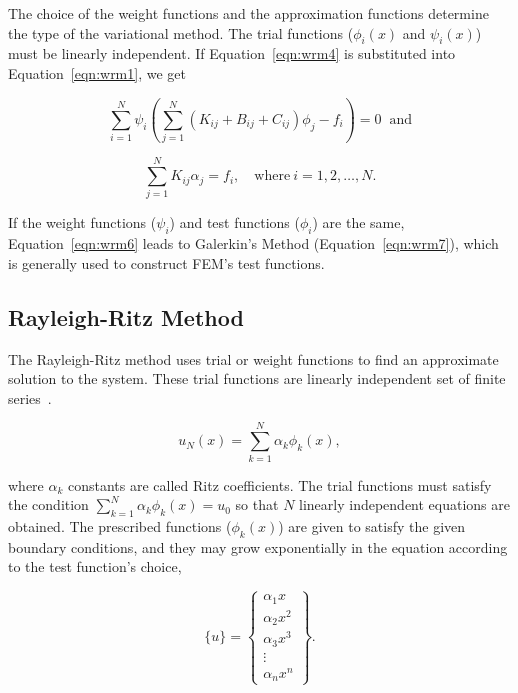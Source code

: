 \noindent The choice of the weight functions and the approximation functions determine the type of the variational method.
The trial functions ($\phi_{i}(x)$ and $\psi_{i}(x)$) must be linearly independent. If Equation~\ref{eqn:wrm4} is substituted into Equation~\ref{eqn:wrm1}, we get

\begin{equation}
\sum\limits_{i=1}^N \psi_{i} \left( \sum\limits_{j=1}^N ( K_{ij} + B_{ij} + C_{ij} ) \phi_{j} - f_{i} \right) = 0 \;\; \text{and}
\label{eqn:wrm6}
\end{equation}


\begin{equation}
\sum\limits_{j=1}^N K_{ij}\alpha_{j} = f_{i},\>\>\;\; \mbox{where}\>i = 1, 2, \ldots, N.
\label{eqn:wrm7}
\end{equation}

If the weight functions ($\psi_{i}$) and test functions ($\phi_{i}$) are the same, Equation~\ref{eqn:wrm6} leads to Galerkin's Method (Equation~\ref{eqn:wrm7}), which is generally used to construct FEM's test functions.


\subsection{Rayleigh-Ritz Method}
The Rayleigh-Ritz method uses trial or weight functions to find an approximate solution to the system. These trial functions are linearly independent set of finite series~\cite{Reddy03}.

\begin{equation}
u_{N}(x) = \sum\limits_{k=1}^N \alpha_{k} \phi_{k}(x),
\label{eqn:rrm1}
\end{equation}

\noindent where $\alpha_{k}$ constants are called Ritz coefficients. The trial functions must satisfy the condition $\sum\limits_{k=1}^N \alpha_{k} \phi_{k}(x) = u_{0}$ so that $N$ linearly independent equations are obtained. The prescribed functions ($\phi_{k}(x)$) are given to satisfy the given boundary conditions, and they may grow exponentially in the equation according to the test function's choice,

\begin{equation}
 \{u\}
 =
\begin{Bmatrix} \alpha_{1}x \\ \alpha_{2}x^2 \\ \alpha_{3}x^3 \\ \vdots \\ \alpha_{n}x^n \end{Bmatrix}.
\label{eqn:rrm2}
\end{equation}

